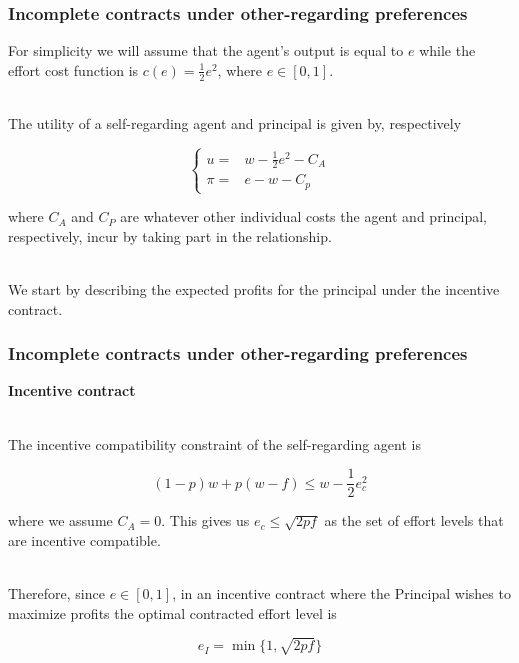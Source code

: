 \documentclass{beamer}
\begin{document}
\begin{frame}
	\frametitle{Incomplete contracts under other-regarding preferences}
	
For simplicity we will assume that the agent's output is equal to $e$ while the effort cost function is $c(e)=\frac{1}{2}e^2$, where $e\in[0,1]$. \\~\

The utility of a self-regarding agent and principal is given by, respectively

\begin{equation}
	\left\{\begin{matrix}
	u =  & w - \frac{1}{2} e^2 - C_A\\ 
	\pi= & e - w - C_p
	\end{matrix}\right.
\end{equation}

\noindent
where $C_A$ and $C_P$ are whatever other individual costs the agent and principal, respectively, incur by taking part in the relationship.\\~\

We start by describing the expected profits for the principal under
the incentive contract.


\end{frame}

\begin{frame}
	\frametitle{Incomplete contracts under other-regarding preferences}
	\textbf{Incentive contract}\\~\
	
The incentive compatibility constraint of the self-regarding agent is

\begin{equation}
	\left(1-p\right) w + p \left(w-f\right) \leq w - \frac{1}{2}e^2_c
\end{equation}	
	
where we assume $C_A = 0$. This gives us $e_c \leq \sqrt{2pf}$ as the set of effort levels that are incentive compatible. \\~\

Therefore, since $e\in [0,1]$, in an incentive contract where the Principal wishes to maximize profits the optimal contracted effort level is

\begin{equation}\label{eq:min_ei}
	e_I = \min\{1,\sqrt{2pf}\}
\end{equation}
	
\end{frame}
\end{document}
